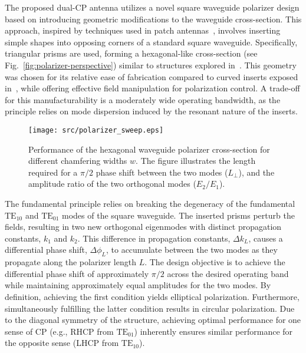 \documentclass[journal,9pt]{IEEEtran}
\newcommand{\TE}[2]{\text{TE}_{#1#2}}
\begin{document}
The proposed dual-CP antenna utilizes a novel square waveguide polarizer design based on introducing geometric modifications to the waveguide cross-section. This approach, inspired by techniques used in patch antennas~\cite{armin-et-al:modification-of-a-2g2hz-sband-rectangular-patch-microstrip-antenna-using-truncated-corner-method-for-satellite-applications}, involves inserting simple shapes into opposing corners of a standard square waveguide. Specifically, triangular prisms are used, forming a hexagonal-like cross-section (see Fig.~\ref{fig:polarizer-perspective}) similar to structures explored in~\cite{bhardwaj-volakis:hexagonal-waveguides-new-class-of-waveguides-for-mmwave-circularly-polarized-horns}. This geometry was chosen for its relative ease of fabrication compared to curved inserts exposed in~\cite{garcia-marin-masa-campos:bowtie-shaped-radiating-element-for-single-and-dual-circular-polarization}, while offering effective field manipulation for polarization control. A trade-off for this manufacturability is a moderately wide operating bandwidth, as the principle relies on mode dispersion induced by the resonant nature of the inserts.

\begin{figure}[!b]
    \centering
    \texttt{[image: src/polarizer\_sweep.eps]}
    \caption{\label{fig:polarizer-sweep}Performance of the hexagonal waveguide polarizer cross-section for different chamfering widths $w$. The figure illustrates the length required for a $\pi/2$ phase shift between the two modes ($L_\perp$), and the amplitude ratio of the two orthogonal modes ($E_2/E_1$).}
\end{figure}

The fundamental principle relies on breaking the degeneracy of the fundamental $\TE 10$ and $\TE 01$ modes of the square waveguide. The inserted prisms perturb the fields, resulting in two new orthogonal eigenmodes with distinct propagation constants, $k_1$ and $k_2$. This difference in propagation constants, $\Delta k_L$, causes a differential phase shift, $\Delta\phi_L$, to accumulate between the two modes as they propagate along the polarizer length $L$. The design objective is to achieve the differential phase shift of approximately $\pi/2$ across the desired operating band while maintaining approximately equal amplitudes for the two modes. By definition, achieving the first condition yields elliptical polarization. Furthermore, simultaneously fulfilling the latter condition results in circular polarization. Due to the diagonal symmetry of the structure, achieving optimal performance for one sense of CP (e.g., RHCP from $\TE 01$) inherently ensures similar performance for the opposite sense (LHCP from $\TE 10$).
\end{document}
